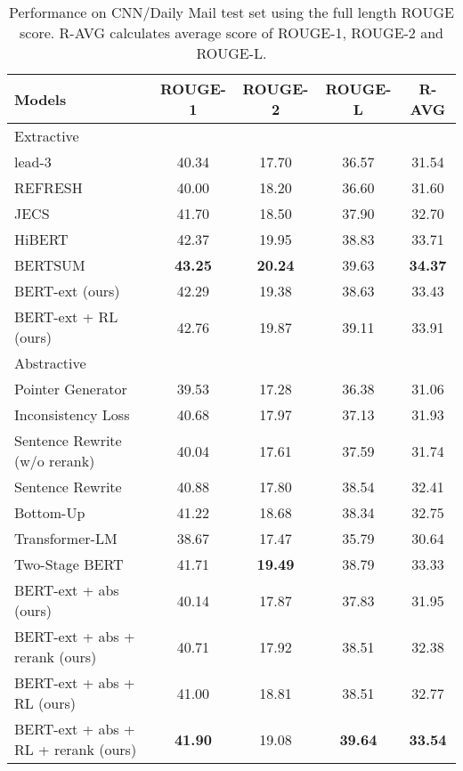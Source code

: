 \documentclass[11pt,a4paper]{article}
\begin{document}
\begin{table*}[t!]
\centering
\begin{adjustbox}{max width=\textwidth}
\begin{tabular}{l|ccc|c}
    \hline
    \bf Models & \bf ROUGE-1 & \bf ROUGE-2 & \bf ROUGE-L & \bf R-AVG \\
    \hline
    \multicolumn{5}{l}{Extractive} \\
    \hline
    lead-3 \cite{see-etal-2017-get} & 40.34 & 17.70 & 36.57 & 31.54 \\
    REFRESH \cite{narayan-etal-2018-ranking} & 40.00 & 18.20 & 36.60 & 31.60 \\
    JECS \cite{xu2019neural} & 41.70 & 18.50 & 37.90 & 32.70 \\
    HiBERT \cite{zhang-etal-2019-hibert} & 42.37 & 19.95 & 38.83 & 33.71 \\
    BERTSUM \cite{liu2019fine} & \bf 43.25 & \bf 20.24 & 39.63 & \bf 34.37 \\
    BERT-ext (ours) & 42.29 & 19.38 & 38.63 & 33.43 \\
    BERT-ext + RL (ours) & 42.76 & 19.87 & 39.11 & 33.91 \\
    \hline
    \multicolumn{5}{l}{Abstractive} \\
    \hline
    Pointer Generator \cite{see-etal-2017-get} & 39.53 & 17.28 & 36.38 & 31.06 \\
    Inconsistency Loss \cite{hsu-etal-2018-unified} & 40.68 & 17.97 & 37.13 & 31.93 \\
    Sentence Rewrite (w/o rerank) \cite{chen-bansal-2018-fast} & 40.04 & 17.61 & 37.59 & 31.74 \\
    Sentence Rewrite \cite{chen-bansal-2018-fast} & 40.88 & 17.80 & 38.54 & 32.41 \\
    Bottom-Up \cite{gehrmann-etal-2018-bottom} & 41.22 & 18.68 & 38.34 & 32.75 \\
    Transformer-LM \cite{hoang2019efficient} & 38.67 & 17.47 & 35.79 & 30.64 \\
    Two-Stage BERT \cite{zhang2019pretraining} & 41.71 & \bf 19.49 & 38.79 & 33.33 \\
    BERT-ext + abs (ours) & 40.14 & 17.87 & 37.83 & 31.95 \\
    BERT-ext + abs + rerank (ours) & 40.71 & 17.92 & 38.51 & 32.38 \\
    BERT-ext + abs + RL (ours) & 41.00 & 18.81 & 38.51 & 32.77 \\
    BERT-ext + abs + RL + rerank (ours) & \bf 41.90 & 19.08 & \bf 39.64 & \bf 33.54 \\
    \hline
\end{tabular}
\end{adjustbox}
\caption{\label{table:cnndm} Performance on CNN/Daily Mail test set using the full length ROUGE  score. R-AVG calculates average score of ROUGE-1, ROUGE-2 and ROUGE-L.}
\end{table*}
\end{document}
